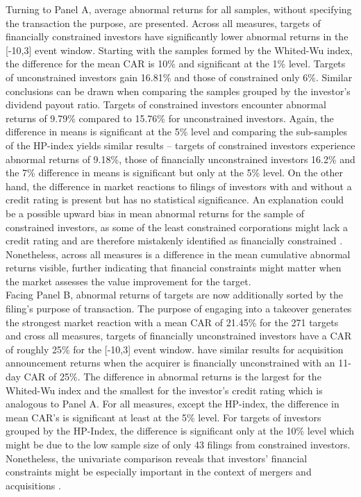 \documentclass[12pt]{article}
\begin{document}
Turning to Panel A, average abnormal returns for all samples, without specifying the transaction the purpose, are presented. Across all measures, targets of financially constrained investors have significantly lower abnormal returns in the [-10,3] event window. Starting with the samples formed by the Whited-Wu index, the difference for the mean CAR is 10\% and significant at the 1\% level. Targets of unconstrained investors gain 16.81\% and those of constrained only 6\%. Similar conclusions can be drawn when comparing the samples grouped by the investor's dividend payout ratio. Targets of constrained investors encounter abnormal returns of 9.79\% compared to 15.76\% for unconstrained investors. Again, the difference in means is significant at the 5\% level and comparing the sub-samples of the HP-index yields similar results -- targets of constrained investors experience abnormal returns of 9.18\%, those of financially unconstrained investors 16.2\% and the 7\% difference in means is significant but only at the 5\% level. On the other hand, the difference in market reactions to filings of investors with and without a credit rating is present but has no statistical significance. An explanation could be a possible upward bias in mean abnormal returns for the sample of constrained investors, as some of the least constrained corporations might lack a credit rating and are therefore mistakenly identified as financially constrained \citep[p.18]{heller2015}.
Nonetheless, across all measures is a difference in the mean cumulative abnormal returns visible, further indicating that financial constraints might  matter when the market assesses the value improvement for the target.\\
%
Facing Panel B, abnormal returns of targets are now additionally sorted by the filing's purpose of transaction. The purpose of engaging into a takeover generates the strongest market reaction with a mean CAR of 21.45\% for the 271 targets and cross all measures, targets of financially unconstrained investors have a CAR of roughly 25\% for the [-10,3] event window. \citet[p.112]{Khatami2014} have similar results for acquisition announcement returns when the acquirer is financially unconstrained with an 11-day CAR of 25\%. The difference in abnormal returns is the largest for the Whited-Wu index and the smallest for the investor's credit rating which is analogous to Panel A. For all measures, except the HP-index, the difference in mean CAR's is significant at least at the 5\% level. For targets of investors grouped by the HP-Index, the difference is significant only at the 10\% level which might be due to the low sample size of only 43 filings from constrained investors. Nonetheless, the univariate comparison reveals that investors' financial constraints might be especially important in the context of mergers and acquisitions \citep[p.112]{Khatami2014}.
\end{document}
